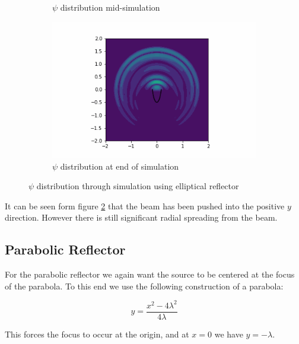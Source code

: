 \documentclass{article}
\begin{document}
\begin{figure}[h]
\begin{subfigure}[b]{0.45\textwidth}
    \caption{$\psi$ distribution mid-simulation}
    \label{fig:ellip-mid}
  \end{subfigure}
  \begin{subfigure}[b]{0.45\textwidth}
    \includegraphics[width=\textwidth]{figures/elliptic-dish-160}
    \caption{$\psi$ distribution at end of simulation}
  \end{subfigure}
  \caption{$\psi$ distribution through simulation using elliptical reflector}
  \label{fig:ellip-distribution}
\end{figure}

It can be seen form figure \ref{fig:ellip-distribution} that the beam has
been pushed into the positive $y$ direction.  However there is still significant
radial spreading from the beam.

\subsection{Parabolic Reflector}

For the parabolic reflector we again want the source to be centered at the
focus of the parabola.  To this end we use the following construction of a
parabola:

$$y = \frac{x^2 - 4\lambda^2}{4\lambda}$$

This forces the focus to occur at the origin, and at $x = 0$ we have
$y = -\lambda$.
\end{document}
